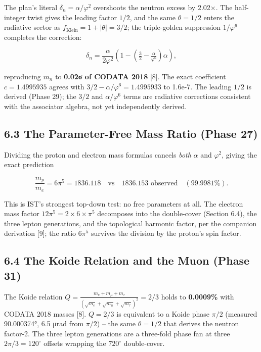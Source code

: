 \documentclass[
  11pt,
]{article}
\begin{document}
The plan's literal \(\delta_n = \alpha/\varphi^2\) overshoots the
neutron excess by 2.02×. The half-integer twist gives the leading factor
\(1/2\), and the same \(\theta = 1/2\) enters the radiative sector as
\(f_{\text{Klein}} = 1 + |\theta| = 3/2\); the triple-golden suppression
\(1/\varphi^6\) completes the correction:

\[\delta_n = \frac{\alpha}{2\varphi^2}\left(1 - \left(\tfrac{3}{2} - \tfrac{\alpha}{\varphi^6}\right)\alpha\right),\]

reproducing \(m_n\) to \textbf{0.02σ of CODATA 2018} {[}8{]}. The exact
coefficient \(c = 1.4995935\) agrees with
\(3/2 - \alpha/\varphi^6 = 1.4995933\) to 1.6e-7. The leading \(1/2\) is
derived (Phase 29); the \(3/2\) and \(\alpha/\varphi^6\) terms are
radiative corrections consistent with the associator algebra, not yet
independently derived.

\subsection{6.3 The Parameter-Free Mass Ratio (Phase
27)}\label{the-parameter-free-mass-ratio-phase-27}

Dividing the proton and electron mass formulas cancels \emph{both}
\(\alpha\) and \(\varphi^2\), giving the exact prediction

\[\frac{m_p}{m_e} = 6\pi^5 = 1836.118 \quad\text{vs}\quad 1836.153 \text{ observed}\quad (99.9981\%).\]

This is IST's strongest top-down test: no free parameters at all. The
electron mass factor \(12\pi^5 = 2 \times 6 \times \pi^5\) decomposes
into the double-cover (Section 6.4), the three lepton generations, and
the topological harmonic factor, per the companion derivation {[}9{]};
the ratio \(6\pi^5\) survives the division by the proton's spin factor.

\subsection{6.4 The Koide Relation and the Muon (Phase
31)}\label{the-koide-relation-and-the-muon-phase-31}

The Koide relation
\(Q = \frac{m_e + m_\mu + m_\tau}{(\sqrt{m_e} + \sqrt{m_\mu} + \sqrt{m_\tau})^2} = 2/3\)
holds to \textbf{0.0009\%} with CODATA 2018 masses {[}8{]}. \(Q = 2/3\)
is equivalent to a Koide phase \(\pi/2\) (measured 90.000374°, 6.5 μrad
from \(\pi/2\)) -- the same \(\theta = 1/2\) that derives the neutron
factor-2. The three lepton generations are a three-fold phase fan at
three \(2\pi/3 = 120^{\circ}\) offsets wrapping the \(720^{\circ}\)
double-cover.
\end{document}
